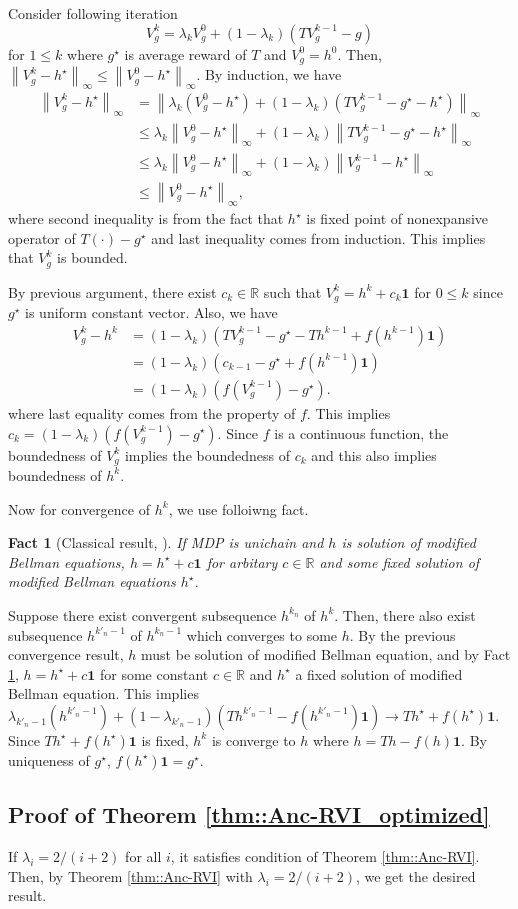 \documentclass{article} %
\newcommand{\real}{\mathbb{R}}
\newcommand{\reals}{\mathbb{R}}
\newcommand*{\infn}[1]{\left\|{#1}\right\|_{\infty}}
\newtheorem{fact}{Fact}
\begin{document}
  Consider following iteration 
  \[ V_g^k  =\lambda_k V_g^0 +(1-\lambda_k)(TV_g^{k-1}-g) \]
  for $1 \le k$ where $g^{\star}$ is average reward of $T$ and $V_g^0=h^0$. Then, $\infn{V_g^{k}-h^{\star}} \le \infn{V_g^{0}-h^{\star}}$. By induction, we have
  \begin{align*}
      \infn{V_g^{k}-h^{\star}} &= \infn{ \lambda_k (V_g^0-h^{\star}) +(1-\lambda_k)(TV_g^{k-1}-g^{\star}-h^{\star})}
      \\& \le \lambda_k\infn{V_g^0-h^{\star}} + (1-\lambda_k)\infn{TV_g^{k-1}-g^{\star}-h^{\star}}
      \\& \le \lambda_k\infn{V_g^0-h^{\star}} + (1-\lambda_k)\infn{V_g^{k-1}-h^{\star}}
    \\& \le \infn{V_g^0-h^{\star}},
  \end{align*}
  where second inequality is from the fact that $h^{\star}$ is fixed point of nonexpansive operator of $T(\cdot)-g^{\star}$ and last inequality comes from induction. This implies that $V^k_g$ is bounded. 
  
 By previous argument, there exist $c_k \in \reals$ such that $V_{g}^k =h^k+c_k \mathbf{1}$ for $ 0\le k$ since $g^{\star}$ is uniform constant vector. Also, we have 
  \begin{align*}
      V_{g}^k -h^k &= (1-\lambda_k)(TV^{k-1}_g-g^{\star}-Th^{k-1}+f(h^{k-1})\mathbf{1})
      \\&   = (1-\lambda_k)(c_{k-1}-g^{\star}+f(h^{k-1})\mathbf{1})
      \\&   = (1-\lambda_k)(f(V_g^{k-1})-g^{\star}).
  \end{align*}
 where last equality comes from the property of $f$. This implies $ c_k = (1-\lambda_k)(f(V_{g}^{k-1})-g^{\star})$. Since $f$ is a continuous function, the boundedness of $V^k_g$ implies the boundedness of $c_k$ and this also implies boundedness of $h^k$. 
 
 Now for convergence of $h^k$, we use folloiwng fact.  
 \begin{fact}[Classical result, ]\label{fact::unique_h}
    If MDP is unichain and $h$ is solution of modified Bellman equations, $h= h^{\star}+c\mathbf{1}$ for arbitary $c \in \real$ and some fixed solution of modified Bellman equations $h^{\star}$.
 \end{fact}
 Suppose there exist convergent subsequence $h^{k_n}$ of $h^k$. Then, there also exist subsequence $h^{k'_n-1}$ of $h^{k_n-1}$ which converges to some $h$. By the previous convergence result, $h$ must be solution of modified Bellman equation, and by Fact \ref{fact::unique_h}, $h = h^{\star}+ c \mathbf{1}$ for some constant $c \in \real$ and $h^{\star}$ a fixed solution of modified Bellman equation. This implies $\lambda_{k'_n-1}(h^{k'_n-1})+(1-\lambda_{k'_n-1})(Th^{k'_n-1}-f(h^{k'_n-1})\mathbf{1}) \rightarrow Th^{\star}+f(h^{\star})\mathbf{1}$. Since $Th^{\star}+f(h^{\star})\mathbf{1}$ is fixed, $h^k$ is converge to $h$ where $h=Th-f(h)\mathbf{1}$. By uniqueness of $g^{\star}$, $f(h^{\star})\mathbf{1}=g^{\star}$.  

 \subsection{Proof of Theorem \ref{thm::Anc-RVI_optimized}}
If $\lambda_i=2/(i+2)$ for all $i$, it satisfies condition of Theorem \ref{thm::Anc-RVI}. Then, by Theorem \ref{thm::Anc-RVI} with $\lambda_i=2/(i+2)$, we get the desired result. 
\end{document}
